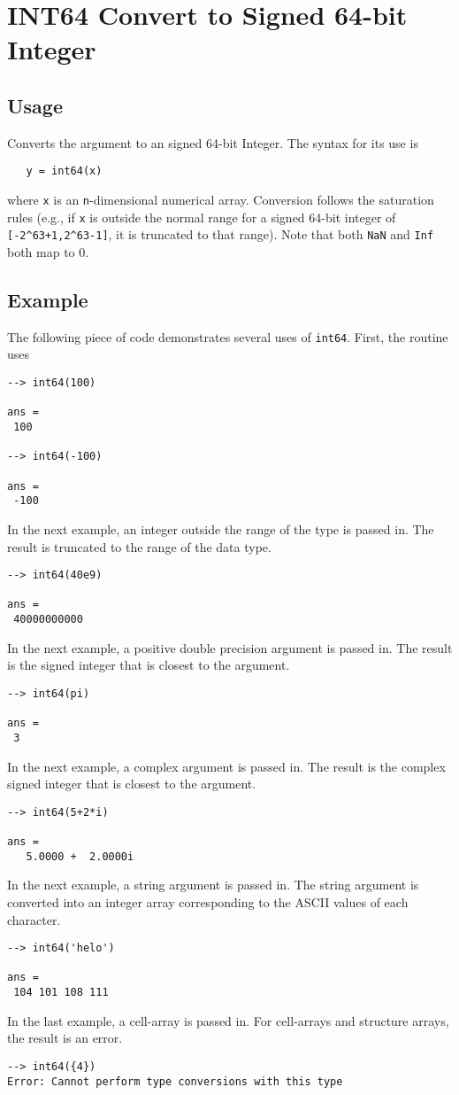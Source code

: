 \section{INT64 Convert to Signed 64-bit Integer}

\subsection{Usage}

Converts the argument to an signed 64-bit Integer.  The syntax
for its use is
\begin{verbatim}
   y = int64(x)
\end{verbatim}
where \verb|x| is an \verb|n|-dimensional numerical array.  Conversion
follows the saturation rules (e.g., if \verb|x| is outside the normal
range for a signed 64-bit integer of \verb|[-2^63+1,2^63-1]|, it is
truncated to that range).  Note that both \verb|NaN| and \verb|Inf| both map to 0.
\subsection{Example}

The following piece of code demonstrates several uses of \verb|int64|.  First, the routine uses
\begin{verbatim}
--> int64(100)

ans = 
 100 

--> int64(-100)

ans = 
 -100 
\end{verbatim}
In the next example, an integer outside the range  of the type is passed in.  
The result is truncated to the range of the data type.
\begin{verbatim}
--> int64(40e9)

ans = 
 40000000000 
\end{verbatim}
In the next example, a positive double precision argument is passed in.  The 
result is the signed integer that is closest to the argument.
\begin{verbatim}
--> int64(pi)

ans = 
 3 
\end{verbatim}
In the next example, a complex argument is passed in.  The result is the 
complex signed integer that is closest to the argument.
\begin{verbatim}
--> int64(5+2*i)

ans = 
   5.0000 +  2.0000i 
\end{verbatim}
In the next example, a string argument is passed in.  The string argument is 
converted into an integer array corresponding to the ASCII values of each character.
\begin{verbatim}
--> int64('helo')

ans = 
 104 101 108 111 
\end{verbatim}
In the last example, a cell-array is passed in.  For cell-arrays and structure 
arrays, the result is an error.
\begin{verbatim}
--> int64({4})
Error: Cannot perform type conversions with this type
\end{verbatim}
